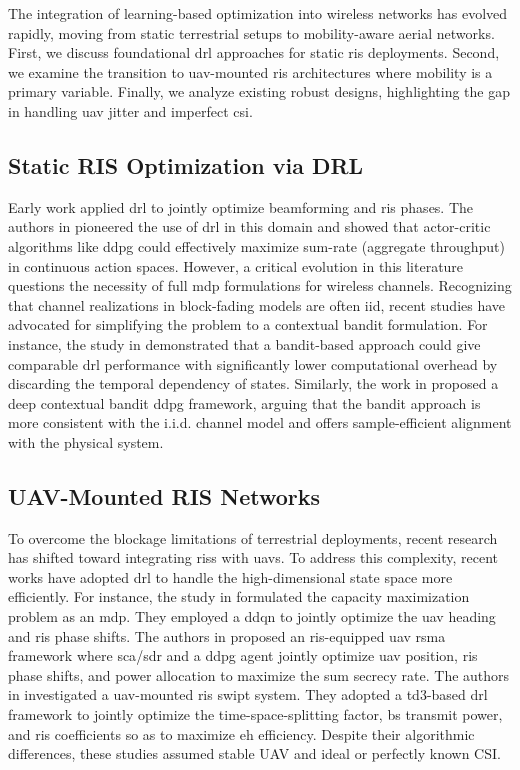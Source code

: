 \documentclass[letterpaper,journal]{IEEEtran}
\begin{document}
The integration of learning-based optimization into wireless networks has evolved rapidly, moving from static terrestrial setups to mobility-aware aerial networks. First, we discuss foundational \gls{drl} approaches for static \gls{ris} deployments. Second, we examine the transition to \gls{uav}-mounted \gls{ris} architectures where mobility is a primary variable. Finally, we analyze existing robust designs, highlighting the gap in handling \gls{uav} jitter and imperfect \gls{csi}.

\subsection{Static RIS Optimization via DRL}

Early work applied \gls{drl} to jointly optimize beamforming and \gls{ris} phases. The authors in \cite{9110869} pioneered the use of \gls{drl} in this domain and showed that actor-critic algorithms like \gls{ddpg} could effectively maximize sum-rate (aggregate throughput) in continuous action spaces. However, a critical evolution in this literature questions the necessity of full \gls{mdp} formulations for wireless channels. Recognizing that channel realizations in block-fading models are often \gls{iid}, recent studies have advocated for simplifying the problem to a contextual bandit formulation. For instance, the study in \cite{9838369} demonstrated that a bandit-based approach could give comparable \gls{drl} performance with significantly lower computational overhead by discarding the temporal dependency of states. Similarly, the work in \cite{10054092} proposed a deep contextual bandit \gls{ddpg} framework, arguing that the bandit approach is more consistent with the i.i.d. channel model and offers sample-efficient alignment with the physical system.

\subsection{UAV-Mounted RIS Networks}
To overcome the blockage limitations of terrestrial deployments, recent research has shifted toward integrating \glspl{ris} with \glspl{uav}. To address this complexity, recent works have adopted \gls{drl} to handle the high-dimensional state space more efficiently. For instance, the study in \cite{9919620} formulated the capacity maximization problem as an \gls{mdp}. They employed a \gls{ddqn} to jointly optimize the \gls{uav} heading and \gls{ris} phase shifts. The authors in \cite{10817512} proposed an \gls{ris}-equipped \gls{uav} \gls{rsma} framework where \gls{sca}/\gls{sdr} and a \gls{ddpg} agent jointly optimize \gls{uav} position, \gls{ris} phase shifts, and power allocation to maximize the sum secrecy rate. The authors in \cite{10812045} investigated a \gls{uav}-mounted \gls{ris} \gls{swipt} system. They adopted a \gls{td3}-based \gls{drl} framework to jointly optimize the time-space-splitting factor, \gls{bs} transmit power, and \gls{ris} coefficients so as to maximize \gls{eh} efficiency. Despite their algorithmic differences, these studies assumed stable UAV and ideal or perfectly known CSI.
\end{document}
